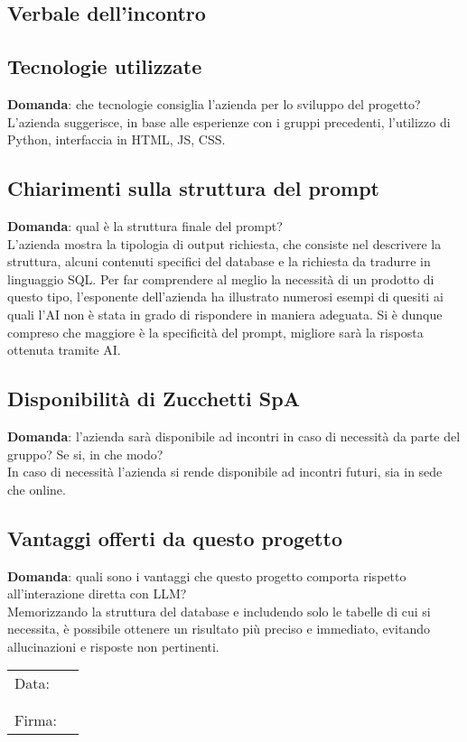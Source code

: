 \documentclass[italian,12pt]{article} %
\begin{document}
\begin{flushleft}
\section{Verbale dell'incontro}
\subsection{Tecnologie utilizzate}
	\textbf{Domanda}: che tecnologie consiglia l'azienda per lo sviluppo del progetto?\\
	L'azienda suggerisce, in base alle esperienze con i gruppi precedenti, l'utilizzo di Python, interfaccia in HTML, JS, CSS.

\subsection{Chiarimenti sulla struttura del prompt}
	\textbf{Domanda}: qual è la struttura finale del prompt?\\
	L'azienda mostra la tipologia di output richiesta, che consiste nel descrivere la struttura, alcuni contenuti specifici del database e la richiesta da tradurre in linguaggio SQL. Per far comprendere al meglio la necessità di un prodotto di questo tipo, l’esponente dell’azienda ha illustrato numerosi esempi 
	di quesiti ai quali l’AI non è stata in grado di rispondere in maniera adeguata. Si è dunque compreso che maggiore è la specificità 
	del prompt, migliore sarà la risposta ottenuta tramite AI.

\subsection{Disponibilità di Zucchetti SpA}
	\textbf{Domanda}: l'azienda sarà disponibile ad incontri in caso di necessità da parte del gruppo? Se si, in che modo?\\
	In caso di necessità l'azienda si rende disponibile ad incontri futuri, sia in sede che online. 

\subsection{Vantaggi offerti da questo progetto}
	\textbf{Domanda}: quali sono i vantaggi che questo progetto comporta rispetto all'interazione diretta con LLM?\\
	Memorizzando la struttura del database e includendo solo le tabelle di cui si necessita, è possibile ottenere un risultato più preciso e immediato, evitando allucinazioni e risposte non pertinenti.
	

\end{flushleft}
\vspace*{3cm}

\begin{table}[b]
	\begin{tabular}{@{}p{.5in}p{4in}@{}}
		Data:  & \hrulefill \\
			   &     		\\
			   &     		\\
		Firma: & \hrulefill \\
	\end{tabular}
	\end{table}
\end{document}
